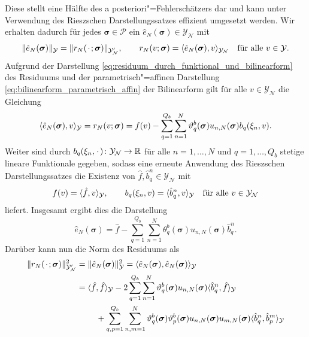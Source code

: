 \documentclass[../main.tex]{subfiles}
\begin{document}
Diese stellt eine Hälfte des a posteriori"=Fehlerschätzers dar und kann unter Verwendung des Rieszschen Darstellungssatzes effizient umgesetzt werden.
Wir erhalten dadurch für jedes $\bm \sigma \in \mathcal P$ ein $\hat{e}_{N}(\bm \sigma) \in \mathcal Y_{\mathcal N}$ mit
\begin{equation}
    \norm{\hat{e}_{N}(\bm \sigma)}_{\mathcal Y} = \norm{r_{N}(\blank; \bm \sigma)}_{\mathcal Y_{\mathcal N}'}, \qquad
    r_{N}(v; \bm \sigma) = \skp{\hat{e}_{N}(\bm \sigma)}{v}{\mathcal Y_{\mathcal N}} \quad \fa v \in \mathcal Y.
\end{equation}
Aufgrund der Darstellung \cref{eq:residuum_durch_funktional_und_bilinearform} des Residuums und der parametrisch"=affinen Darstellung \cref{eq:bilinearform_parametrisch_affin} der Bilinearform gilt für alle $v \in \mathcal Y_{\mathcal N}$ die Gleichung
\begin{equation}
    \skp{\hat{e}_{N}(\bm \sigma)}{v}{\mathcal Y}
    = r_{N}(v; \bm \sigma)
    = f(v) - \sum_{q = 1}^{Q_b} \sum_{n = 1}^{N} \theta_{q}^{b}(\bm \sigma) u_{n,N}(\bm \sigma) b_{q}(\xi_{n}, v).
\end{equation}
Weiter sind durch $b_{q}(\xi_{n}, \blank) \colon \mathcal Y_{\mathcal N} \to \mathbb{R}$ für alle $n = 1, \dots, N$ und $q = 1, \dots, Q_b$ stetige lineare Funktionale gegeben, sodass eine erneute Anwendung des Rieszschen Darstellungssatzes die Existenz von $\hat{f}, \hat{b}^{n}_{q} \in \mathcal Y_{\mathcal N}$ mit
\begin{equation}
    f(v) = \skp{\hat{f}}{v}{\mathcal Y},
    \qquad
    b_{q}(\xi_{n}, v) = \skp{\hat{b}^{n}_{q}}{v}{\mathcal Y}
    \quad \fa v \in \mathcal Y_{\mathcal N}
\end{equation}
liefert.
Insgesamt ergibt dies die Darstellung
\begin{equation}
    \hat{e}_{N}(\bm \sigma) = \hat{f} - \sum_{q = 1}^{Q_b} \sum_{n = 1}^{N} \theta_{q}^{b}(\bm \sigma) u_{n,N}(\bm \sigma) \hat{b}^{n}_{q}.
\end{equation}
Darüber kann nun die Norm des Residuums als
\begin{equation}
    \begin{aligned}
        \norm{r_{N}(\blank; \bm \sigma)}_{\mathcal Y_{\mathcal N}'}^{2}
        &= \norm{\hat{e}_{N}(\bm \sigma)}_{\mathcal Y}^{2}
        = \skp{\hat{e}_{N}(\bm \sigma)}{\hat{e}_{N}(\bm \sigma)}{\mathcal Y}
        \\&= \begin{multlined}[t]
            \skp{\hat{f}}{\hat{f}}{\mathcal Y}
                - 2 \sum_{q = 1}^{Q_b} \sum_{n = 1}^{N} \theta_{q}^{b}(\bm \sigma) u_{n,N}(\bm \sigma) \skp{\hat{b}^{n}_{q}}{\hat{f}}{\mathcal Y}
                \\+ \sum_{q, p = 1}^{Q_b} \sum_{n, m = 1}^{N} \theta_{q}^{b}(\bm \sigma) \theta_{p}^{b}(\bm \sigma) u_{n,N}(\bm \sigma) u_{m,N}(\bm \sigma) \skp{\hat{b}^{n}_{q}}{\hat{b}^{m}_{p}}{\mathcal Y}
        \end{multlined}
    \end{aligned}
\end{equation}
\end{document}
